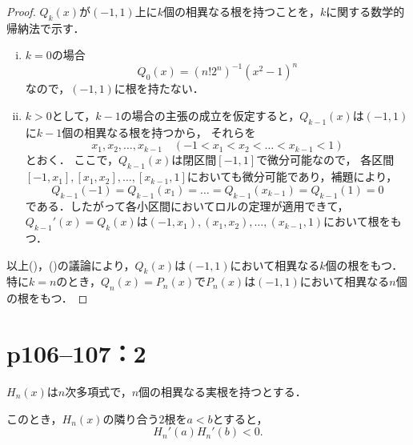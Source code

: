 \documentclass[a4paper,10pt,fleqn]{ltjsarticle}
\begin{document}
\begin{leftbar}
    \begin{proof}
        $Q_k (x)$が$(-1,1)$上に$k$個の相異なる根を持つことを，$k$に関する数学的帰納法で示す．
        \begin{enumerate}[(i)]
            \item $k=0$の場合
                  \[
                      Q_0(x)= (n! 2^n)^{-1} (x^2-1)^n
                  \]
                  なので，$(-1,1)$に根を持たない．
            \item $k>0$として，$k-1$の場合の主張の成立を仮定すると，$Q_{k-1}(x)$は$(-1,1)$に$k-1$個の相異なる根を持つから，
                  それらを
                  \[
                      x_1,x_2,\dots,x_{k-1}\quad (-1<x_1<x_2<\dots <x_{k-1}<1)
                  \]とおく．
                  ここで，$Q_{k-1} (x)$は閉区間$[-1,1]$で微分可能なので，
                  各区間$[-1,x_1],[x_1,x_2],\dots,[x_{k-1},1]$においても微分可能であり，補題により，
                  \[
                      Q_{k-1} (-1) = Q_{k-1}(x_1)=\dots = Q_{k-1}(x_{k-1})=Q_{k-1}(1)=0
                  \]
                  である．したがって各小区間においてロルの定理が適用できて，$Q_{k-1}' (x)=Q_k(x)$は$(-1,x_1),(x_1,x_2),\dots,(x_{k-1},1)$において根をもつ．
        \end{enumerate}
        以上()，()の議論により，$Q_k (x)$は$(-1,1)$において相異なる$k$個の根をもつ．
        特に$k=n$のとき，$Q_n (x)=P_n(x)$で$P_n (x)$は$(-1,1)$において相異なる$n$個の根をもつ．
    \end{proof}
\end{leftbar}

\newpage

\section*{p106--107：2}




$H_n(x)$は$n$次多項式で，$n$個の相異なる実根を持つとする．

このとき，$H_n (x)$の隣り合う$2$根を$a < b$とすると，
\[
    H_n'(a) H_n'(b)<0.
\]
\end{document}
